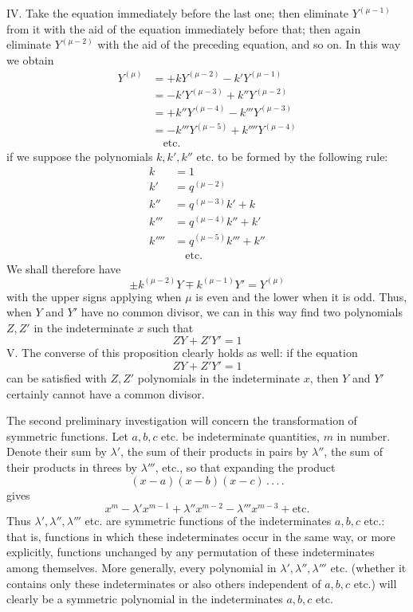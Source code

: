 IV. Take the equation immediately before the last one; then eliminate $Y^{(\mu-1)}$ from it with the aid of the equation immediately before that; then again eliminate $Y^{(\mu-2)}$ with the aid of the preceding equation, and so on. In this way we obtain
\[
\begin{aligned}
Y^{(\mu)}&=+kY^{(\mu-2)}-k'Y^{(\mu-1)}\\
&=-k'Y^{(\mu-3)}+k''Y^{(\mu-2)}\\
&=+k''Y^{(\mu-4)}-k'''Y^{(\mu-3)}\\
&=-k'''Y^{(\mu-5)}+k''''Y^{(\mu-4)}\\
&\quad\text{etc.}
\end{aligned}
\]
if we suppose the polynomials $k,k',k''$ etc. to be formed by the following rule:
\[
\begin{aligned}
k&=1\\
k'&=q^{(\mu-2)}\\
k''&=q^{(\mu-3)}k'+k\\
k'''&=q^{(\mu-4)}k''+k'\\
k''''&=q^{(\mu-5)}k'''+k''\\
&\quad\text{etc.}
\end{aligned}
\]
We shall therefore have
\[
\pm k^{(\mu-2)}Y\mp k^{(\mu-1)}Y'=Y^{(\mu)}
\]
with the upper signs applying when $\mu$ is even and the lower when it is odd. Thus, when $Y$ and $Y'$ have no common divisor, we can in this way find two polynomials $Z,Z'$ in the indeterminate $x$ such that
\[
ZY+Z'Y'=1
\]
V. The converse of this proposition clearly holds as well: if the equation
\[
ZY+Z'Y'=1
\]
can be satisfied with $Z,Z'$ polynomials in the indeterminate $x$, then $Y$ and $Y'$ certainly cannot have a common divisor.

The second preliminary investigation will concern the transformation of symmetric functions. Let $a,b,c$ etc. be indeterminate quantities, $m$ in number. Denote their sum by $\lambda'$, the sum of their products in pairs by $\lambda''$, the sum of their products in threes by $\lambda'''$, etc., so that expanding the product
\[
(x-a)(x-b)(x-c)\, .\, .\, .\, .
\]
gives
\[
x^m-\lambda'x^{m-1}+\lambda''x^{m-2}-\lambda'''x^{m-3}+\text{etc.}
\]
Thus $\lambda',\lambda'',\lambda'''$ etc. are symmetric functions of the indeterminates $a,b,c$ etc.: that is, functions in which these indeterminates occur in the same way, or more explicitly, functions unchanged by any permutation of these indeterminates among themselves. More generally, every polynomial in $\lambda',\lambda'',\lambda'''$ etc. (whether it contains only these indeterminates or also others independent of $a,b,c$ etc.) will clearly be a symmetric polynomial in the indeterminates $a,b,c$ etc.


